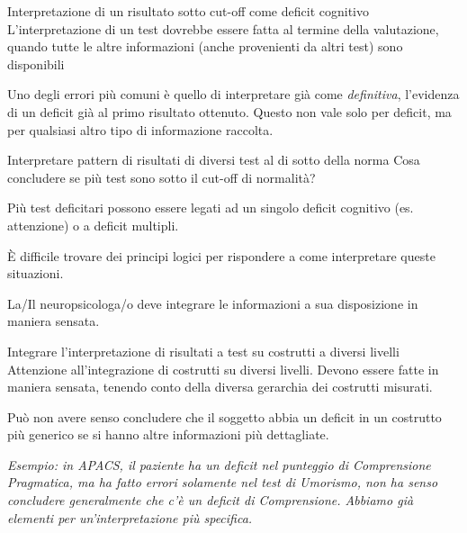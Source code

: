 \documentclass[
  ignorenonframetext,
]{beamer}
\begin{document}
\begin{frame}{\normalsize Interpretazione di un risultato sotto cut-off
come deficit cognitivo}
\label{interpretazione-di-un-risultato-sotto-cut-off-come-deficit-cognitivo-2}
L'interpretazione di un test dovrebbe essere fatta al termine della
valutazione, quando tutte le altre informazioni (anche provenienti da
altri test) sono disponibili

Uno degli errori più comuni è quello di interpretare già come
\emph{definitiva}, l'evidenza di un deficit già al primo risultato
ottenuto. Questo non vale solo per deficit, ma per qualsiasi altro tipo
di informazione raccolta.
\end{frame}

\begin{frame}{\normalsize Interpretare pattern di risultati di diversi
test al di sotto della norma}
\label{interpretare-pattern-di-risultati-di-diversi-test-al-di-sotto-della-norma}
Cosa concludere se più test sono sotto il cut-off di normalità?

Più test deficitari possono essere legati ad un singolo deficit
cognitivo (es. attenzione) o a deficit multipli. \pause

È difficile trovare dei principi logici per rispondere a come
interpretare queste situazioni. \pause

La/Il neuropsicologa/o deve integrare le informazioni a sua disposizione
in maniera sensata.
\end{frame}

\begin{frame}{\normalsize Integrare l'interpretazione di risultati a
test su costrutti a diversi livelli}
\label{integrare-linterpretazione-di-risultati-a-test-su-costrutti-a-diversi-livelli}
Attenzione all'integrazione di costrutti su diversi livelli. Devono
essere fatte in maniera sensata, tenendo conto della diversa gerarchia
dei costrutti misurati.

Può non avere senso concludere che il soggetto abbia un deficit in un
costrutto più generico se si hanno altre informazioni più dettagliate.

\pause

\emph{Esempio: in APACS, il paziente ha un deficit nel punteggio di Comprensione Pragmatica, ma ha fatto errori solamente nel test di Umorismo, non ha senso concludere generalmente che c’è un deficit di Comprensione. Abbiamo già elementi per un’interpretazione più specifica.}
\end{frame}
\end{document}
